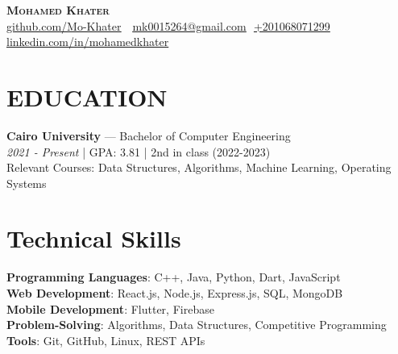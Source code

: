 \documentclass[letterpaper,11pt]{article}
\begin{document}
\begin{flushright}
  \vspace{-4pt}
\end{flushright}

\vspace{-7pt}

\begin{center}
    \textbf{\Huge \scshape Mohamed Khater} \\ \vspace{8pt}
    \small 
    \faGithub
    \href{https://github.com/Mo-Khater}{\underline{github.com/Mo-Khater}} $  $
    \faEnvelope$  $
    \href{mailto:mk0015264@gmail.com}
    {\underline{mk0015264@gmail.com}}
    \faPhone$  $
    \underline{+201068071299}
    \faLinkedin$  $
    \href{https://www.linkedin.com/in/mohamed-khater-924782243/}{\underline{linkedin.com/in/mohamedkhater}} $  $
\end{center}

\section{EDUCATION}
\begin{itemize}[leftmargin=0.15in, label={}]
    \normalsize{\item{
        \textbf{Cairo University}{ --- Bachelor of Computer Engineering} \\ 
        \textit{2021 - Present} | GPA: 3.81 | 2nd in class (2022-2023) \\ 
        Relevant Courses: Data Structures, Algorithms, Machine Learning, Operating Systems
    }}
\end{itemize}

\section{Technical Skills}
 \begin{itemize}[leftmargin=0.15in, label={}]
    \small{\item{
    
     \textbf{Programming Languages}{: C++, Java, Python, Dart, JavaScript} \\
     \textbf{Web Development}{: React.js, Node.js, Express.js, SQL, MongoDB} \\
     
     \textbf{Mobile Development}{: Flutter, Firebase} \\

     \textbf{Problem-Solving}{: Algorithms, Data Structures, Competitive Programming} \\
     \textbf{Tools}{: Git, GitHub, Linux, REST APIs} \\
     
    }}
 \end{itemize}
\end{document}
